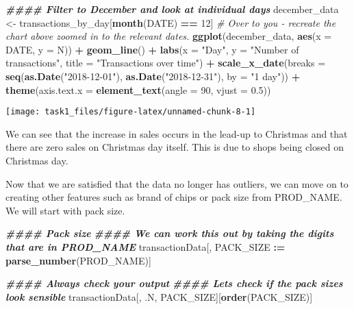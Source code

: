 \documentclass[
]{article}
\newenvironment{Shaded}{\begin{snugshade}}{\end{snugshade}}
\newcommand{\AttributeTok}[1]{\textcolor[rgb]{0.13,0.29,0.53}{#1}}
\newcommand{\CommentTok}[1]{\textcolor[rgb]{0.56,0.35,0.01}{\textit{#1}}}
\newcommand{\DecValTok}[1]{\textcolor[rgb]{0.00,0.00,0.81}{#1}}
\newcommand{\DocumentationTok}[1]{\textcolor[rgb]{0.56,0.35,0.01}{\textbf{\textit{#1}}}}
\newcommand{\FloatTok}[1]{\textcolor[rgb]{0.00,0.00,0.81}{#1}}
\newcommand{\FunctionTok}[1]{\textcolor[rgb]{0.13,0.29,0.53}{\textbf{#1}}}
\newcommand{\NormalTok}[1]{#1}
\newcommand{\OtherTok}[1]{\textcolor[rgb]{0.56,0.35,0.01}{#1}}
\newcommand{\SpecialCharTok}[1]{\textcolor[rgb]{0.81,0.36,0.00}{\textbf{#1}}}
\newcommand{\StringTok}[1]{\textcolor[rgb]{0.31,0.60,0.02}{#1}}
\begin{document}
\begin{Shaded}
\begin{Highlighting}[]
\DocumentationTok{\#\#\#\# Filter to December and look at individual days}
\NormalTok{december\_data }\OtherTok{\textless{}{-}}\NormalTok{ transactions\_by\_day[}\FunctionTok{month}\NormalTok{(DATE) }\SpecialCharTok{==} \DecValTok{12}\NormalTok{]}
\CommentTok{\# Over to you {-} recreate the chart above zoomed in to the relevant dates.}
\FunctionTok{ggplot}\NormalTok{(december\_data, }\FunctionTok{aes}\NormalTok{(}\AttributeTok{x =}\NormalTok{ DATE, }\AttributeTok{y =}\NormalTok{ N)) }\SpecialCharTok{+}
  \FunctionTok{geom\_line}\NormalTok{() }\SpecialCharTok{+}
  \FunctionTok{labs}\NormalTok{(}\AttributeTok{x =} \StringTok{"Day"}\NormalTok{, }\AttributeTok{y =} \StringTok{"Number of transactions"}\NormalTok{, }\AttributeTok{title =} \StringTok{"Transactions over time"}\NormalTok{) }\SpecialCharTok{+}
  \FunctionTok{scale\_x\_date}\NormalTok{(}\AttributeTok{breaks =} \FunctionTok{seq}\NormalTok{(}\FunctionTok{as.Date}\NormalTok{(}\StringTok{"2018{-}12{-}01"}\NormalTok{), }\FunctionTok{as.Date}\NormalTok{(}\StringTok{"2018{-}12{-}31"}\NormalTok{), }\AttributeTok{by =} \StringTok{"1 day"}\NormalTok{)) }\SpecialCharTok{+}
  \FunctionTok{theme}\NormalTok{(}\AttributeTok{axis.text.x =} \FunctionTok{element\_text}\NormalTok{(}\AttributeTok{angle =} \DecValTok{90}\NormalTok{, }\AttributeTok{vjust =} \FloatTok{0.5}\NormalTok{))}
\end{Highlighting}
\end{Shaded}

\begin{center}\texttt{[image: task1\_files/figure-latex/unnamed-chunk-8-1]} \end{center}

We can see that the increase in sales occurs in the lead-up to Christmas
and that there are zero sales on Christmas day itself. This is due to
shops being closed on Christmas day.

Now that we are satisfied that the data no longer has outliers, we can
move on to creating other features such as brand of chips or pack size
from PROD\_NAME. We will start with pack size.

\begin{Shaded}
\begin{Highlighting}[]
\DocumentationTok{\#\#\#\# Pack size}
\DocumentationTok{\#\#\#\# We can work this out by taking the digits that are in PROD\_NAME}
\NormalTok{transactionData[, PACK\_SIZE }\SpecialCharTok{:=} \FunctionTok{parse\_number}\NormalTok{(PROD\_NAME)]}

\DocumentationTok{\#\#\#\# Always check your output}
\DocumentationTok{\#\#\#\# Let\textquotesingle{}s check if the pack sizes look sensible}
\NormalTok{transactionData[, .N, PACK\_SIZE][}\FunctionTok{order}\NormalTok{(PACK\_SIZE)]}
\end{Highlighting}
\end{Shaded}
\end{document}
